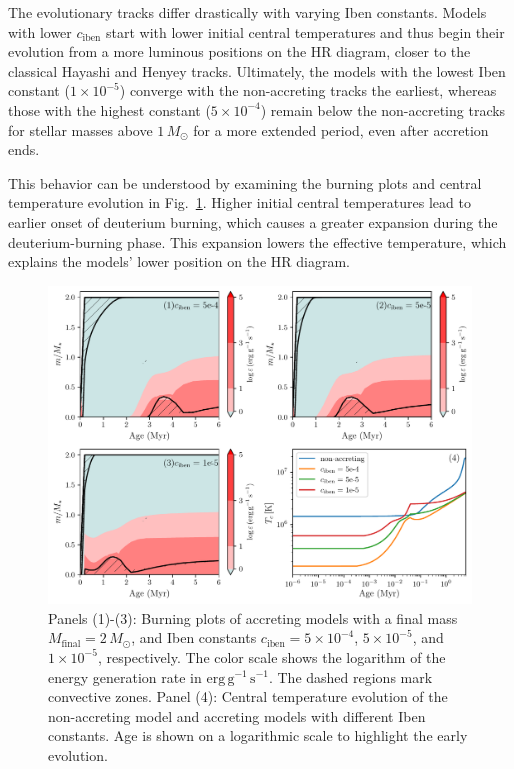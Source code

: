 \documentclass[12pt,a4paper]{article}
\newcommand{\mr}{\mathrm}
\begin{document}
The evolutionary tracks differ drastically with varying Iben constants. Models with lower $c_\mr{iben}$ start with lower initial central temperatures and thus begin their evolution from a more luminous positions on the HR diagram, closer to the classical Hayashi and Henyey tracks. Ultimately, the models with the lowest Iben constant ($1 \times 10^{-5}$) converge with the non-accreting tracks the earliest, whereas those with the highest constant ($5 \times 10^{-4}$) remain below the non-accreting tracks for stellar masses above $1\,M_\odot$ for a more extended period, even after accretion ends.

This behavior can be understood by examining the burning plots and central temperature evolution in Fig.~\ref{fig:comp_iben_burning}. Higher initial central temperatures lead to earlier onset of deuterium burning, which causes a greater expansion during the deuterium-burning phase. This expansion lowers the effective temperature, which explains the models' lower position on the HR diagram.

\begin{figure}
  \centering
  \includegraphics[width=.98\textwidth,keepaspectratio]{ciben_burning.pdf}
  \caption{Panels (1)-(3): Burning plots of accreting models with a final mass $M_\mr{final} = 2\,M_\odot$, and Iben constants $c_\mr{iben} =  5\times10^{-4}$, $5\times10^{-5}$, and $1\times10^{-5}$, respectively. The color scale shows the logarithm of the energy generation rate in $\mr{erg\,g^{-1}\,s^{-1}}$. The dashed regions mark convective zones. Panel (4): Central temperature evolution of the non-accreting model and accreting models with different Iben constants. Age is shown on a logarithmic scale to highlight the early evolution.}
  \label{fig:comp_iben_burning}
\end{figure}
\end{document}
